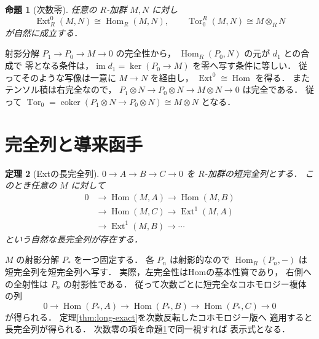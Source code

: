 \documentclass[a5paper,10pt,onecolumn]{jsarticle}
\makeatletter
\theoremstyle{mathnotetheorem}
\newtheorem{theorem}{定理}[section]
\newtheorem{proposition}[theorem]{命題}
\renewcommand{\proofname}{証明}
\renewenvironment{proof}[1][\proofname]{%
  \par\pushQED{\qed}\normalfont\topsep4\p@\@plus2\p@\relax
  \trivlist\item[\hskip\labelsep\bfseries #1]\ignorespaces
}{\popQED\endtrivlist\@endpefalse}
\makeatother
\begin{document}
\begin{proposition}[次数零]\label{prop:degree-zero}
任意の $R$-加群 $M,N$ に対し
\[
 \operatorname{Ext}_R^0(M,N)\cong\operatorname{Hom}_R(M,N),
 \qquad
 \operatorname{Tor}^R_0(M,N)\cong M\otimes_RN
\]
が自然に成立する．
\end{proposition}
\begin{proof}
射影分解 $P_1\to P_0\to M\to0$ の完全性から，
$\operatorname{Hom}_R(P_0,N)$ の元が $d_1$ との合成で
零となる条件は，$\operatorname{im}d_1=\ker(P_0\to M)$
を零へ写す条件に等しい．
従ってそのような写像は一意に $M\to N$ を経由し，
$\operatorname{Ext}^0\cong\operatorname{Hom}$ を得る．
またテンソル積は右完全なので，
$P_1\otimes N\to P_0\otimes N\to M\otimes N\to0$
は完全である．
従って
$\operatorname{Tor}_0=\operatorname{coker}(P_1\otimes N\to
P_0\otimes N)\cong M\otimes N$ となる．
\end{proof}

\section{完全列と導来函手}

\begin{theorem}[Extの長完全列]\label{thm:ext-long}
$0\to A\to B\to C\to0$ を $R$-加群の短完全列とする．
このとき任意の $M$ に対して
\[
 \begin{aligned}
 0&\to\operatorname{Hom}(M,A)
   \to\operatorname{Hom}(M,B)\\
  &\to\operatorname{Hom}(M,C)
   \to\operatorname{Ext}^1(M,A)\\
  &\to\operatorname{Ext}^1(M,B)\to\cdots
 \end{aligned}
\]
という自然な長完全列が存在する．
\end{theorem}
\begin{proof}
$M$ の射影分解 $P_*$ を一つ固定する．
各 $P_n$ は射影的なので $\operatorname{Hom}_R(P_n,-)$ は
短完全列を短完全列へ写す．
実際，左完全性はHomの基本性質であり，
右側への全射性は $P_n$ の射影性である．
従って次数ごとに短完全なコホモロジー複体の列
\[
 0\to\operatorname{Hom}(P_*,A)
 \to\operatorname{Hom}(P_*,B)
 \to\operatorname{Hom}(P_*,C)\to0
\]
が得られる．
定理\ref{thm:long-exact}を次数反転したコホモロジー版へ
適用すると長完全列が得られる．
次数零の項を命題\ref{prop:degree-zero}で同一視すれば
表示式となる．
\end{proof}
\end{document}
